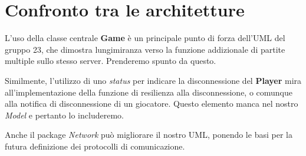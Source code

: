 \documentclass[12pt]{article}
\begin{document}
\section{Confronto tra le architetture}

L’uso della classe centrale \textbf{Game} è un principale punto di forza dell’UML del gruppo 23, che dimostra lungimiranza verso la funzione addizionale di partite multiple sullo stesso server. Prenderemo spunto da questo.

Similmente, l’utilizzo di uno \textit{status} per indicare la disconnessione del \textbf{Player} mira all’implementazione della funzione di resilienza alla disconnessione, o comunque alla notifica di disconnessione di un giocatore. Questo elemento manca nel nostro \textit{Model} e pertanto lo includeremo.

Anche il package \textit{Network} può migliorare il nostro UML, ponendo le basi per la futura definizione dei protocolli di comunicazione.
\end{document}
